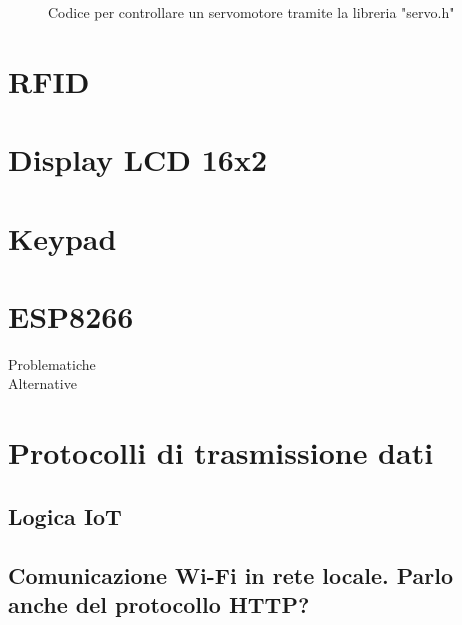 \documentclass[12pt]{report}
\begin{document}
\begin{figure}
	\caption{Codice per controllare un servomotore tramite la libreria "servo.h"}
	\label{fig:servo_code}
\end{figure}

%
\section{RFID}
%

%
\section{Display LCD 16x2}
%

%
\section{Keypad}
%

%
\section{ESP8266}\label{sec:esp8266}
%
Problematiche
\\
Alternative


%
\section{Protocolli di trasmissione dati}
%


%
\subsection{Logica IoT}
%

%
\subsection{Comunicazione Wi-Fi in rete locale. Parlo anche del protocollo HTTP?}
%
\end{document}
